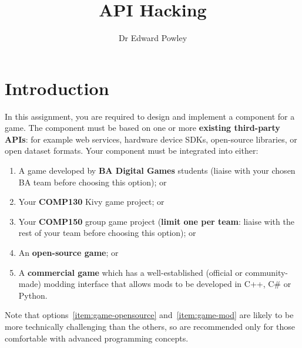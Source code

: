 \documentclass{../fal_assignment}
\title{API Hacking}
\author{Dr Edward Powley}
\begin{document}
\maketitle
%    
\section*{Introduction}

In this assignment, you are required to design and implement a component for a game.
The component must be based on one or more \textbf{existing third-party APIs}:
for example web services, hardware device SDKs, open-source libraries, or open dataset formats.
Your component must be integrated into either:
\begin{enumerate}[label=(\alph*)]
    \item A game developed by \textbf{BA Digital Games} students (liaise with your chosen BA team before choosing this option); or
    \item Your \textbf{COMP130} Kivy game project; or
    \item Your \textbf{COMP150} group game project (\textbf{limit one per team}: liaise with the rest of your team before choosing this option); or
    \item \label{item:game-opensource} An \textbf{open-source game}; or
    \item \label{item:game-mod} A \textbf{commercial game} which has a well-established (official or community-made) modding interface that allows mods to be developed in C++, C\# or Python.
\end{enumerate}
Note that options~\ref{item:game-opensource} and~\ref{item:game-mod} are likely to be more technically challenging than the others,
so are recommended only for those comfortable with advanced programming concepts.
\end{document}

